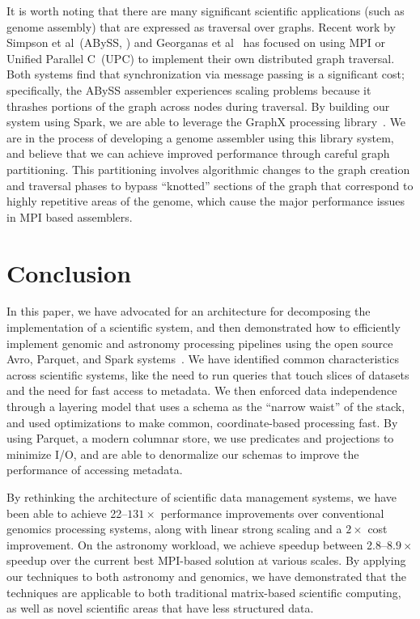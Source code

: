 \documentclass[10pt]{report} %
\begin{document}
It is worth noting that there are many significant scientific applications (such as genome
assembly) that are expressed as traversal over graphs. Recent work by Simpson et al~(ABySS,
\cite{simpson09}) and Georganas et al~\cite{georganas14} has focused on using MPI
or Unified Parallel C~(UPC) to implement their own distributed graph traversal. Both systems
find that synchronization via message passing is a significant cost; specifically, the ABySS assembler
experiences scaling problems because it thrashes portions of the graph across nodes during traversal.
By building our system using Spark, we are able to leverage the GraphX processing library~\cite{gonzalez14,
xin13}. We are in the process of developing a genome assembler using this library system, and
believe that we can achieve improved performance through careful graph partitioning. This partitioning involves
algorithmic changes to the graph creation and traversal phases to bypass ``knotted'' sections of the
graph that correspond to highly repetitive areas of the genome, which cause the major performance
issues in MPI based assemblers.

\section{Conclusion}
\label{sec:conclusion}

In this paper, we have advocated for an architecture for decomposing the implementation of a scientific
system, and then demonstrated how to efficiently implement genomic and astronomy processing pipelines using
the open source Avro, Parquet, and Spark systems~\cite{avro, parquet, zaharia10}. We have identified common
characteristics across scientific systems, like the need to run queries that touch slices of datasets and the need
for fast access to metadata. We then enforced data independence through a layering model that uses a schema
as the ``narrow waist'' of the stack, and used optimizations to make common, coordinate-based processing
fast. By using Parquet, a modern columnar store, we use predicates and projections to minimize I/O, and are able
to denormalize our schemas to improve the performance of accessing metadata.

By rethinking the architecture of scientific data management systems, we have been able to achieve
22--$131\times$ performance improvements over conventional genomics processing systems, along with linear
strong scaling and a $2\times$ cost improvement. On the astronomy workload, we achieve speedup between
2.8--$8.9\times$ speedup over the current best MPI-based solution at various scales. By applying our techniques
to both astronomy and genomics, we have demonstrated that the techniques are applicable to both traditional
matrix-based scientific computing, as well as novel scientific areas that have less structured data.

\balance

\appendix



\end{document}
